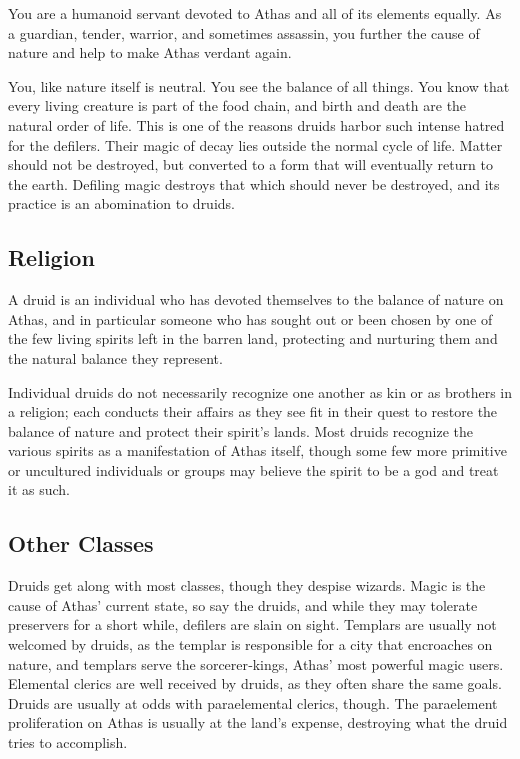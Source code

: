You are a humanoid servant devoted to Athas and all of its elements equally. As a guardian, tender, warrior, and sometimes assassin, you further the cause of nature and help to make Athas verdant again.

You, like nature itself is neutral. You see the balance of all things. You know that every living creature is part of the food chain, and birth and death are the natural order of life. This is one of the reasons druids harbor such intense hatred for the defilers. Their magic of decay lies outside the normal cycle of life. Matter should not be destroyed, but converted to a form that will eventually return to the earth. Defiling magic destroys that which should never be destroyed, and its practice is an abomination to druids.

\subsection{Religion}

A druid is an individual who has devoted themselves to the balance of nature on Athas, and in particular someone who has sought out or been chosen by one of the few living spirits left in the barren land, protecting and nurturing them and the natural balance they represent.

Individual druids do not necessarily recognize one another as kin or as brothers in a religion; each conducts their affairs as they see fit in their quest to restore the balance of nature and protect their spirit's lands. Most druids recognize the various spirits as a manifestation of Athas itself, though some few more primitive or uncultured individuals or groups may believe the spirit to be a god and treat it as such.

\subsection{Other Classes}

Druids get along with most classes, though they despise wizards. Magic is the cause of Athas' current state, so say the druids, and while they may tolerate preservers for a short while, defilers are slain on sight. Templars are usually not welcomed by druids, as the templar is responsible for a city that encroaches on nature, and templars serve the sorcerer‐kings, Athas' most powerful magic users. Elemental clerics are well received by druids, as they often share the same goals. Druids are usually at odds with paraelemental clerics, though. The paraelement proliferation on Athas is usually at the land's expense, destroying what the druid tries to accomplish.

